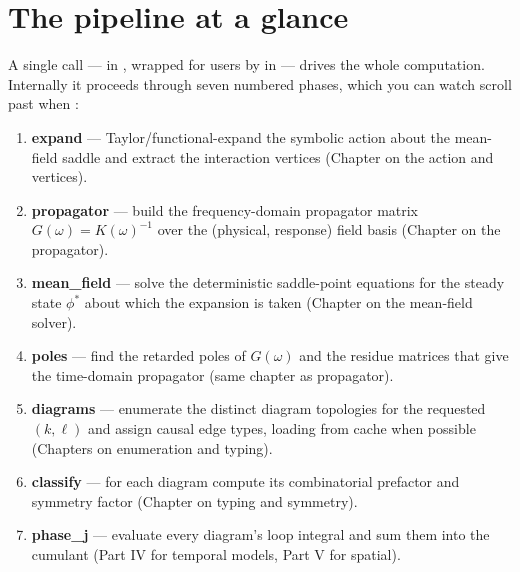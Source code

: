 \section{The pipeline at a glance}

A single call ---  in ,
wrapped for users by  in  --- drives the
whole computation.  Internally it proceeds through seven numbered phases, which
you can watch scroll past when :

\begin{enumerate}
  \item \textbf{expand} --- Taylor/functional-expand the symbolic action about the
        mean-field saddle and extract the interaction vertices
        (Chapter on the action and vertices).
  \item \textbf{propagator} --- build the frequency-domain propagator matrix
        $G(\omega) = K(\omega)^{-1}$ over the (physical, response) field basis
        (Chapter on the propagator).
  \item \textbf{mean\_field} --- solve the deterministic saddle-point equations
        for the steady state $\phi^{*}$ about which the expansion is taken
        (Chapter on the mean-field solver).
  \item \textbf{poles} --- find the retarded poles of $G(\omega)$ and the residue
        matrices that give the time-domain propagator (same chapter as
        propagator).
  \item \textbf{diagrams} --- enumerate the distinct diagram topologies for the
        requested $(k,\ell)$ and assign causal edge types, loading from cache
        when possible (Chapters on enumeration and typing).
  \item \textbf{classify} --- for each diagram compute its combinatorial prefactor
        and symmetry factor (Chapter on typing and symmetry).
  \item \textbf{phase\_j} --- evaluate every diagram's loop integral and sum them
        into the cumulant (Part IV for temporal models, Part V for spatial).
\end{enumerate}

